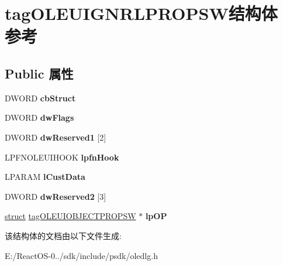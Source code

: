 \hypertarget{structtag_o_l_e_u_i_g_n_r_l_p_r_o_p_s_w}{}\section{tag\+O\+L\+E\+U\+I\+G\+N\+R\+L\+P\+R\+O\+P\+S\+W结构体 参考}
\label{structtag_o_l_e_u_i_g_n_r_l_p_r_o_p_s_w}
\subsection*{Public 属性}
\begin{DoxyCompactItemize}
\item 
\mbox{\label{structtag_o_l_e_u_i_g_n_r_l_p_r_o_p_s_w_a653c099281d77705992195b55c5871e7}} 
D\+W\+O\+RD {\bfseries cb\+Struct}
\item 
\mbox{\label{structtag_o_l_e_u_i_g_n_r_l_p_r_o_p_s_w_acee0bbe6d9b02ce6e52f808728e2a4e5}} 
D\+W\+O\+RD {\bfseries dw\+Flags}
\item 
\mbox{\label{structtag_o_l_e_u_i_g_n_r_l_p_r_o_p_s_w_a63f8e8cd19185f3d9adb0b9abd09631a}} 
D\+W\+O\+RD {\bfseries dw\+Reserved1} \mbox{[}2\mbox{]}
\item 
\mbox{\label{structtag_o_l_e_u_i_g_n_r_l_p_r_o_p_s_w_adaed88388fc46b1b36cfc85d44037792}} 
L\+P\+F\+N\+O\+L\+E\+U\+I\+H\+O\+OK {\bfseries lpfn\+Hook}
\item 
\mbox{\label{structtag_o_l_e_u_i_g_n_r_l_p_r_o_p_s_w_a9ecd805fcc9b4ace9311a40aa2e40315}} 
L\+P\+A\+R\+AM {\bfseries l\+Cust\+Data}
\item 
\mbox{\label{structtag_o_l_e_u_i_g_n_r_l_p_r_o_p_s_w_aff0e7dc3d4b73073e4f352bc320eb2a6}} 
D\+W\+O\+RD {\bfseries dw\+Reserved2} \mbox{[}3\mbox{]}
\item 
\mbox{\label{structtag_o_l_e_u_i_g_n_r_l_p_r_o_p_s_w_af0efddd749fcd8a05a93d2801cef2fb8}} 
\hyperlink{interfacestruct}{struct} \hyperlink{structtag_o_l_e_u_i_o_b_j_e_c_t_p_r_o_p_s_w}{tag\+O\+L\+E\+U\+I\+O\+B\+J\+E\+C\+T\+P\+R\+O\+P\+SW} $\ast$ {\bfseries lp\+OP}
\end{DoxyCompactItemize}


该结构体的文档由以下文件生成\+:\begin{DoxyCompactItemize}
\item 
E\+:/\+React\+O\+S-\/0../sdk/include/psdk/oledlg.\+h\end{DoxyCompactItemize}
